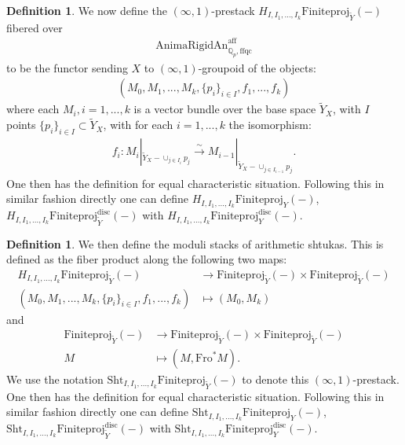 \documentclass[12pt]{article}
\theoremstyle{definition}
\newtheorem{definition}[theorem]{Definition}
\numberwithin{equation}{section}
\begin{document}
\begin{definition}
We now define the $(\infty,1)$-prestack $H_{I,I_1,...,I_k}\mathrm{Finiteproj}_{\widetilde{Y}}(-)$ fibered over 
\begin{align}
\mathrm{AnimaRigidAn}^\mathrm{aff}_{\mathbb{Q}_p,\mathrm{ffqc}} 
\end{align}
to be the functor sending $X$ to $(\infty,1)$-groupoid of the objects:
\begin{align}
(M_0,M_1,...,M_k, \{p_i\}_{i\in I}, f_1,...,f_k)	
\end{align}
where each $M_i,i=1,...,k$ is a vector bundle over the base space $\widetilde{Y}_X$, with $I$ points $\{p_i\}_{i\in I}\subset \widetilde{Y}_X$, with for each $i=1,...,k$ the isomorphism:
\begin{align}
f_i: M_i|_{\widetilde{Y}_X-\cup_{j\in I_i}p_j}	\overset{\sim}{\longrightarrow} M_{i-1}|_{\widetilde{Y}_X-\cup_{j\in I_{i-1}}p_j}.
\end{align}
One then has the definition for equal characteristic situation. Following this in similar fashion directly one can define $H_{I,I_1,...,I_k}\mathrm{Finiteproj}_{{Y}}(-)$, $H_{I,I_1,...,I_k}\mathrm{Finiteproj}^\mathrm{disc}_{\widetilde{Y}}(-)$ with $H_{I,I_1,...,I_k}\mathrm{Finiteproj}^\mathrm{disc}_{Y}(-)$.
\end{definition}


\begin{definition}
We then define the moduli stacks of arithmetic shtukas. This is defined as the fiber product along the following two maps:
\begin{align}
H_{I,I_1,...,I_k}\mathrm{Finiteproj}_{\widetilde{Y}}(-)&\rightarrow \mathrm{Finiteproj}_{\widetilde{Y}}(-)\times \mathrm{Finiteproj}_{\widetilde{Y}}(-)	\\
(M_0,M_1,...,M_k, \{p_i\}_{i\in I}, f_1,...,f_k)&\mapsto(M_0,M_k)
\end{align}
and
\begin{align}
\mathrm{Finiteproj}_{\widetilde{Y}}(-)&\rightarrow \mathrm{Finiteproj}_{\widetilde{Y}}(-)\times \mathrm{Finiteproj}_{\widetilde{Y}}(-)\\
M&\mapsto (M, \mathrm{Fro}^{*}M).	
\end{align}
We use the notation $\mathrm{Sht}_{I,I_1,...,I_k}\mathrm{Finiteproj}_{\widetilde{Y}}(-)$ to denote this $(\infty,1)$-prestack. One then has the definition for equal characteristic situation. Following this in similar fashion directly one can define $\mathrm{Sht}_{I,I_1,...,I_k}\mathrm{Finiteproj}_{{Y}}(-)$, $\mathrm{Sht}_{I,I_1,...,I_k}\mathrm{Finiteproj}^\mathrm{disc}_{\widetilde{Y}}(-)$ with $\mathrm{Sht}_{I,I_1,...,I_k}\mathrm{Finiteproj}^\mathrm{disc}_{Y}(-)$.
\end{definition}
\end{document}
